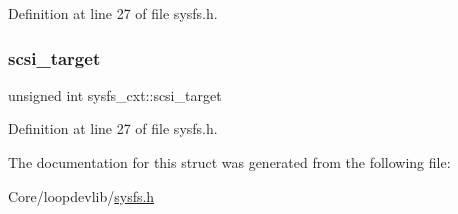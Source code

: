 Definition at line 27 of file sysfs.\+h.

\mbox{\label{structsysfs__cxt_a1db1f90d3baf894e7d18c32cb136c6da}} 
\subsubsection{\texorpdfstring{scsi\+\_\+target}{scsi\_target}}
{\footnotesize\ttfamily unsigned int sysfs\+\_\+cxt\+::scsi\+\_\+target}



Definition at line 27 of file sysfs.\+h.



The documentation for this struct was generated from the following file\+:\begin{DoxyCompactItemize}
\item 
Core/loopdevlib/\hyperlink{sysfs_8h}{sysfs.\+h}\end{DoxyCompactItemize}
